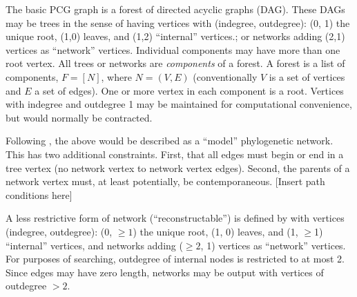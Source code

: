 \documentclass[11pt]{article}
\begin{document}
The basic PCG graph is a forest of directed acyclic graphs (DAG). 
These DAGs may be trees in the sense of having vertices with (indegree, outdegree): (0, 1) the unique root, (1,0) leaves, and (1,2) ``internal'' vertices.; or networks adding (2,1) vertices as ``network'' vertices.
Individual components may have more than one root vertex.
All trees or networks are \textit{components} of a forest. 
A forest is a list of components, $F = [N]$, where $N = (V, E)$ (conventionally $V$ is a set of vertices and $E$ a set of edges).
One or more vertex in each component is a root. 
Vertices with indegree and outdegree 1 may be maintained for computational convenience, but would normally be contracted.
 
Following \cite{moretetal2004}, the above would be described as a ``model'' phylogenetic network.
This has two additional constraints.
First, that all edges must begin or end in a tree vertex (no network vertex to network vertex edges).  
Second,  the parents of a network vertex must, at least potentially, be contemporaneous. 
[Insert path conditions here]  
 
A less restrictive form of network (``reconstructable'') is defined by \cite{moretetal2004} with vertices (indegree, outdegree): 
(0, $\ge 1$) the unique root, (1, 0) leaves, and (1, $\ge$1) ``internal'' vertices, and networks adding ($\ge 2$, 1) vertices as ``network'' vertices.  For purposes of searching, outdegree of internal nodes is restricted to at most 2. Since edges may have zero length, networks may be output with vertices of outdegree $> 2$.
\end{document}
